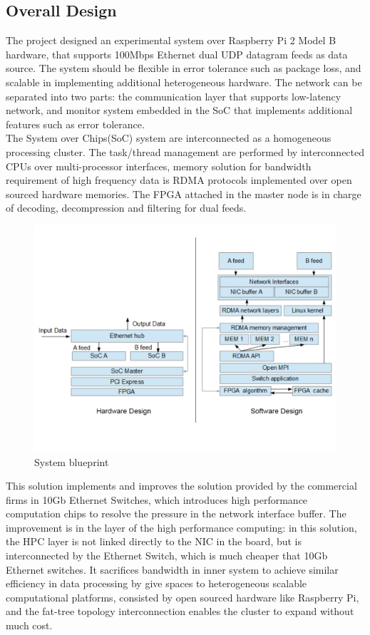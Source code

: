 \documentclass[11pt,openright,a4paper]{report}
\begin{document}
\subsection{Overall Design}
The project designed an experimental system over Raspberry Pi 2 Model B hardware, that supports 100Mbps Ethernet dual UDP datagram feeds as data source. The system should be flexible in error tolerance such as package loss, and scalable in implementing additional heterogeneous hardware. The network can be separated into two parts: the communication layer that supports low-latency network, and monitor system embedded in the SoC that implements additional features such as error tolerance. \\ 
The System over Chips(SoC) system are interconnected as a homogeneous processing cluster. The task/thread management are performed by interconnected CPUs over multi-processor interfaces, memory solution for bandwidth requirement of high frequency data is RDMA protocols implemented over open sourced hardware memories. The FPGA attached in the master node is in charge of decoding, decompression and filtering for dual feeds.\\
\begin{figure}[H]
	\centering\includegraphics[width=1.0\linewidth]{picture/System_Design.jpg}
	\caption{System blueprint}
	\label{fig:system_design}
\end{figure}
This solution implements and improves the solution provided by the commercial firms in 10Gb Ethernet Switches, which introduces high performance computation chips to resolve the pressure in the network interface buffer. The improvement is in the layer of the high performance computing: in this solution, the HPC layer is not linked directly to the NIC in the board, but is interconnected by the Ethernet Switch, which is much cheaper that 10Gb Ethernet switches. It sacrifices bandwidth in inner system to achieve similar efficiency in data processing by give spaces to heterogeneous scalable computational platforms, consisted by open sourced hardware like Raspberry Pi, and the fat-tree topology interconnection enables the cluster to expand without much cost.\\
\end{document}
